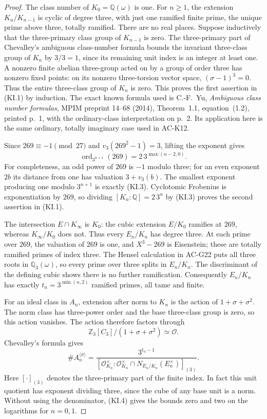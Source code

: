 \begin{proof}
The class number of $K_0=\mathbb Q(\omega)$ is one.
For $n\geq1$, the extension $K_n/K_{n-1}$ is cyclic of degree
three, with just one ramified finite prime, the unique prime
above three, totally ramified.  There are no real places.
Suppose inductively that the three-primary class group of
$K_{n-1}$ is zero.  The three-primary part of Chevalley's
ambiguous class-number formula bounds the invariant three-class
group of $K_n$ by $3/3=1$, since its remaining unit index is
an integer at least one.  A nonzero finite abelian three-group
acted on by a group of order three has nonzero fixed points:
on its nonzero three-torsion vector space, $(\sigma-1)^3=0$.
Thus the entire three-class group of $K_n$ is zero.  This proves
the first assertion in (KI.1) by induction.  The exact known
formula used is C.-F.~Yu, \emph{Ambiguous class number formulas},
MPIM preprint 14--68 (2014), Theorem~1.1, equation~(1.2),
printed p.~1, with the ordinary-class interpretation on p.~2.
Its application here is the same ordinary, totally imaginary
case used in AC-K12.

Since $269\equiv-1\pmod{27}$ and
$v_3(269^2-1)=3$, lifting the exponent gives
\[
 \operatorname{ord}_{3^{n+1}}(269)
       =2\,3^{\max(n-2,0)}.                             \tag{KI.3}
\]
For completeness, an odd power of $269$ is $-1$ modulo three;
for an even exponent $2b$ its distance from one has valuation
$3+v_3(b)$.  The smallest exponent producing one modulo
$3^{n+1}$ is exactly (KI.3).  Cyclotomic Frobenius is exponentiation
by $269$, so dividing $[K_n:\mathbb Q]=2\,3^n$ by (KI.3)
proves the second assertion in (KI.1).

The intersection $E\cap K_\infty$ is $K_0$: the cubic extension
$E/K_0$ ramifies at $269$, whereas $K_\infty/K_0$ does not.
Thus every $E_n/K_n$ has degree three.  At each prime over
$269$, the valuation of $269$ is one, and $X^3-269$ is
Eisenstein; these are totally ramified primes of index three.
The Hensel calculation in AC-G22 puts all three roots in
$\mathbb Q_3(\omega)$, so every prime over three splits in
$E_n/K_n$.  The discriminant of the defining cubic shows there
is no further ramification.  Consequently $E_n/K_n$ has exactly
$t_n=3^{\min(n,2)}$ ramified primes, all tame and finite.

For an ideal class in $A_n$, extension after norm to $K_n$ is
the action of $1+\sigma+\sigma^2$.  The norm class has three-power
order and the base three-class group is zero, so this action
vanishes.  The action therefore factors through
\[
 \mathbb Z_3[C_3]/(1+\sigma+\sigma^2)\simeq\mathcal O.
\]
Chevalley's formula gives
\[
 \#A_n^{\langle\sigma\rangle}
 =\frac{3^{t_n-1}}
 {[\mathcal O_{K_n}^{\times}:
   \mathcal O_{K_n}^{\times}\cap
              N_{E_n/K_n}(E_n^{\times})]_{(3)}}.        \tag{KI.4}
\]
Here $[\cdot]_{(3)}$ denotes the three-primary part of the
finite index.  In fact this unit quotient has exponent dividing
three, since the cube of any base unit is a norm.
Without using the denominator, (KI.4) gives the bounds zero
and two on the logarithms for $n=0,1$.


\end{proof}
